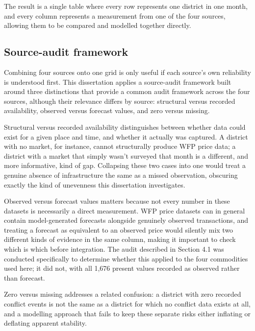 \documentclass[12pt,a4paper]{article}
\begin{document}
The result is a single table where every row represents one district in one month, and every column represents a measurement from one of the four sources, allowing them to be compared and modelled together directly.

\subsection{Source-audit framework}

Combining four sources onto one grid is only useful if each source's own reliability is understood first. This dissertation applies a source-audit framework built around three distinctions that provide a common audit framework across the four sources, although their relevance differs by source: structural versus recorded availability, observed versus forecast values, and zero versus missing.

Structural versus recorded availability distinguishes between whether data could exist for a given place and time, and whether it actually was captured. A district with no market, for instance, cannot structurally produce WFP price data; a district with a market that simply wasn't surveyed that month is a different, and more informative, kind of gap. Collapsing these two cases into one would treat a genuine absence of infrastructure the same as a missed observation, obscuring exactly the kind of unevenness this dissertation investigates.

Observed versus forecast values matters because not every number in these datasets is necessarily a direct measurement. WFP price datasets can in general contain model-generated forecasts alongside genuinely observed transactions, and treating a forecast as equivalent to an observed price would silently mix two different kinds of evidence in the same column, making it important to check which is which before integration. The audit described in Section 4.1 was conducted specifically to determine whether this applied to the four commodities used here; it did not, with all 1,676 present values recorded as observed rather than forecast.

Zero versus missing addresses a related confusion: a district with zero recorded conflict events is not the same as a district for which no conflict data exists at all, and a modelling approach that fails to keep these separate risks either inflating or deflating apparent stability.
\end{document}
